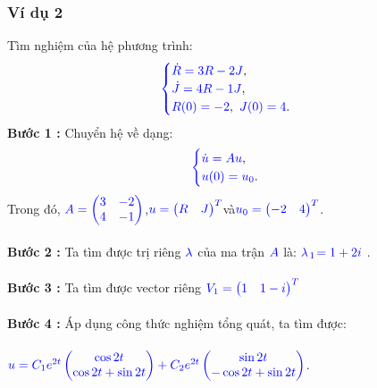 \documentclass[a4paper]{article}
\begin{document}
\subsubsection{Ví dụ 2}
Tìm nghiệm của hệ phương trình:
\begin{align}
	    \textcolor{blue}{
	    \begin{cases}
            \dot R = 3R - 2J \textcolor{black}{,}\\
            \dot J = 4R - 1J \textcolor{black}{,}\\
            R(0) = -2\textcolor{black}{,} \enskip J(0) = 4 \textcolor{black}{.}
        \end{cases}
        }
        \notag
	\end{align}
{\bfseries Bước 1 :} Chuyển hệ về dạng:
\begin{align}
	    \textcolor{blue}{
	    \begin{cases}
            \dot u = Au \textcolor{black}{,}\\
            u(0) = u\sb{0}\textcolor{black}{.}
        \end{cases}
        }
        \notag
	\end{align}
Trong đó,  $\textcolor{blue}{A = \begin{pmatrix} 3 & -2\\ 4 & -1 \end{pmatrix}}$,\enskip $\textcolor{blue}{u = \begin{pmatrix} R & J \end{pmatrix}\sp{T}}$\enskip và\enskip $\textcolor{blue}{u\sb{0} = \begin{pmatrix} -2 & 4 \end{pmatrix}\sp{T}}$.\\\\
{\bfseries Bước 2 :} Ta tìm được trị riêng $\textcolor{blue}{\lambda}$ của ma trận $\textcolor{blue}{A}$ là: $\textcolor{blue}{\lambda}$$\textcolor{blue}{\sb{1}}$$\textcolor{blue}{=1+2i}$ .\\\\
{\bfseries Bước 3 :} Ta tìm được vector riêng \enskip $\textcolor{blue}{V\sb{1} = \begin{pmatrix} 1 & 1-i \end{pmatrix}\sp{T}}$\enskip\\\\
{\bfseries Bước 4 :} Áp dụng công thức nghiệm tổng quát, ta tìm được:\\\\
$\textcolor{blue}{u = C\sb{1} e\sp{2t}\begin{pmatrix} \cos{2t} \\  \cos{2t}+\sin{2t} \end{pmatrix} + C\sb{2} e\sp{2t}\begin{pmatrix} \sin{2t} \\ -\cos{2t}+\sin{2t} \end{pmatrix}}$.\\\\
\end{document}
